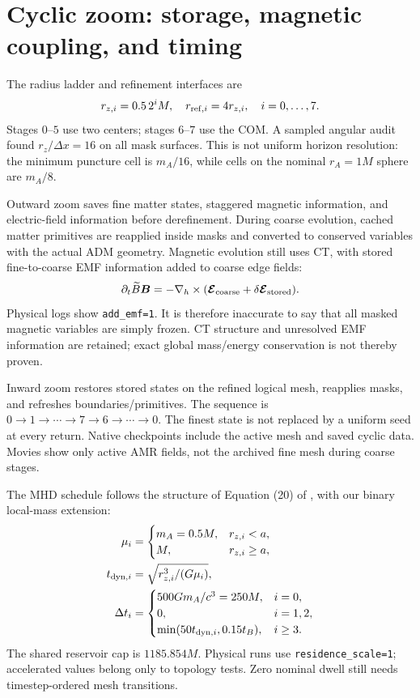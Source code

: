 \documentclass[twocolumn,anonymous]{aastex701}
\newcommand{\Btilde}{\widetilde{B}}
\begin{document}
\section{Cyclic zoom: storage, magnetic coupling, and timing}\label{sec:zoom}
The radius ladder and refinement interfaces are
\begin{equation}
 r_{z,i}=0.5\,2^iM,\quad r_{{\rm ref},i}=4r_{z,i},\quad i=0,\ldots,7.
\end{equation}
Stages $0$--$5$ use two centers; stages $6$--$7$ use the COM. A sampled angular audit found $r_z/\Delta x=16$ on all mask surfaces. This is not uniform horizon resolution: the minimum puncture cell is $m_A/16$, while cells on the nominal $r_A=1M$ sphere are $m_A/8$.

Outward zoom saves fine matter states, staggered magnetic information, and electric-field information before derefinement. During coarse evolution, cached matter primitives are reapplied inside masks and converted to conserved variables with the actual ADM geometry. Magnetic evolution still uses CT, with stored fine-to-coarse EMF information added to coarse edge fields:
\begin{equation}
 \partial_t\Btilde{\boldsymbol B}=-\nabla_h\times
 (\boldsymbol{\mathcal E}_{\rm coarse}+\delta\boldsymbol{\mathcal E}_{\rm stored}).
\end{equation}
Physical logs show \texttt{add\_emf=1}. It is therefore inaccurate to say that all masked magnetic variables are simply frozen. CT structure and unresolved EMF information are retained; exact global mass/energy conservation is not thereby proven.

Inward zoom restores stored states on the refined logical mesh, reapplies masks, and refreshes boundaries/primitives. The sequence is $0\to1\to\cdots\to7\to6\to\cdots\to0$. The finest state is not replaced by a uniform seed at every return. Native checkpoints include the active mesh and saved cyclic data. Movies show only active AMR fields, not the archived fine mesh during coarse stages.

The MHD schedule follows the structure of Equation (20) of \citet{Guo2025}, with our binary local-mass extension:
\begin{align}
 \mu_i&=\begin{cases}m_A=0.5M,&r_{z,i}<a,\\M,&r_{z,i}\geq a,\end{cases}\nonumber\\
 t_{{\rm dyn},i}&=\sqrt{r_{z,i}^3/(G\mu_i)},\nonumber\\
 \Delta t_i&=\begin{cases}
 500Gm_A/c^3=250M,&i=0,\\
 0,&i=1,2,\\
 \min(50t_{{\rm dyn},i},0.15t_B),&i\geq3.
 \end{cases}\label{eq:dwell}
\end{align}
The shared reservoir cap is $1185.854M$. Physical runs use \texttt{residence\_scale=1}; accelerated values belong only to topology tests. Zero nominal dwell still needs timestep-ordered mesh transitions.
\end{document}
